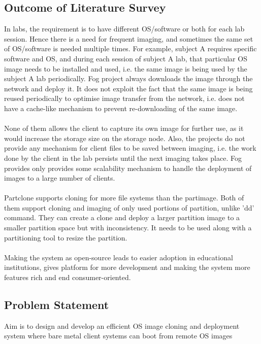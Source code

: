 \documentclass[a4paper,12pt]{article}
\begin{document}
\subsection{ Outcome of Literature Survey}
In labs, the requirement is to have different OS/software or both for each lab session. Hence there is a need for frequent imaging, and sometimes the same set of OS/software is needed multiple times. For example, subject A requires specific software and OS, and during each session of subject A lab, that particular OS image needs to be installed and used, i.e. the same image is being used by the subject A lab periodically. Fog project always downloads the image through the network and deploy it. It does not exploit the fact that the same image is being reused periodically to optimise image transfer from the network, i.e. does not have a cache-like mechanism to prevent re-downloading of the same image.
\paragraph{} 
None of them allows the client to capture its own image for further use, as it would increase the storage size on the storage node. Also,  the projects do not provide any mechanism for client files to be saved between imaging, i.e. the work done by the client in the lab persists until the next imaging takes place. Fog provides only provides some scalability mechanism to handle the deployment of images to a large number of clients.  
\paragraph{}
Partclone supports cloning for more file systems than the partimage. Both of them support cloning and imaging of only used portions of partition, unlike 'dd' command. They can create a clone and deploy a larger partition image to a smaller partition space but with inconsistency. It needs to be used along with a partitioning tool to resize the partition.
\paragraph{}
 Making the system as open-source leads to easier adoption  in educational institutions, gives platform for more development and making the system more features rich and end consumer-oriented. 

\subsection{Problem Statement}
Aim is to design and develop an efficient OS image cloning and deployment system where bare metal client systems can boot from remote OS images
\end{document}

